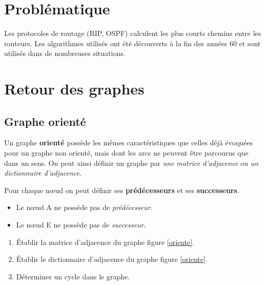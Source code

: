 \documentclass[a4paper,11pt]{article}
\begin{document}
\section{Problématique}
Les protocoles de routage (RIP, OSPF) calculent les plus courts chemins entre les routeurs. Les algorithmes utilisés ont été découverts à la fin des années 60 et sont utilisés dans de nombreuses situations.
\begin{center}
\end{center}
\section{Retour des graphes}
\subsection{Graphe orienté}
Un graphe \textbf{orienté} possède les mêmes caractéristiques que celles déjà évoquées pour un graphe non orienté, mais dont les arcs ne peuvent être parcourus que dans un sens. On peut ainsi définir un graphe par \emph{une matrice d'adjacence} ou \emph{un dictionnaire d'adjacence}.
\begin{center}
    \label{oriente}
\end{center}
\begin{aretenir}[]
    Pour chaque nœud on peut définir ses \textbf{prédécesseurs} et ses \textbf{successeurs}.
    \begin{itemize}
        \item Le nœud A ne possède pas de \emph{prédécesseur}.
        \item Le nœud E ne possède pas de \emph{successeur}.
    \end{itemize}
\end{aretenir}
\begin{activite}
    \begin{enumerate}
        \item Établir la matrice d'adjacence du graphe figure \ref{oriente}.
        \item Établir le dictionnaire d'adjacence du graphe figure \ref{oriente}.
        \item Déterminer un cycle dans le graphe.
    \end{enumerate}
\end{activite}
\end{document}
